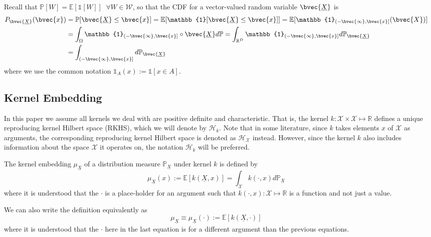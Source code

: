 \documentclass[twoside]{article} \usepackage{aistats2017}
\newcommand{\rv}[1]{\underline{#1}}
\newcommand{\extra}[1]{{\color{ForestGreen} #1}}
\begin{document}
		Recall that $\mathbb{P}[W] = \mathbb{E}[\mathbb{1}[W]] \;\; \forall W \in \mathcal{W}$, so that the CDF for a vector-valued random variable $\bvec{\rv{X}}$ is
		\begin{equation}
			\begin{aligned}
				P_{\bvec{\rv{X}}}(\bvec{x}) &= \mathbb{P}[\bvec{\rv{X}} \leq \bvec{x}] = \mathbb{E}[\mathbb{1}[\bvec{\rv{X}} \leq \bvec{x}]] = \mathbb{E}[\mathbb{1}_{(-\bvec{\infty}, \bvec{x}]}(\bvec{X})] \\
				&= \int_{\Omega} \mathbb{1}_{(-\bvec{\infty}, \bvec{x}]} \circ \bvec{\rv{X}} d \mathbb{P} = \int_{\mathbb{R}^{D}} \mathbb{1}_{(-\bvec{\infty}, \bvec{x}]} d \mathbb{P}_{\bvec{\rv{X}}} \\
				&= \int_{(-\bvec{\infty}, \bvec{x}]} d \mathbb{P}_{\bvec{\rv{X}}}
			\end{aligned}
		\label{eq:cdf_integral}
		\end{equation}
		where we use the common notation $\mathbb{1}_{A}(x) := \mathbb{1}[x \in A]$.
		
	\subsection{Kernel Embedding}
	
		In this paper we assume all kernels we deal with are positive definite and characteristic. That is, the kernel $k : \mathcal{X} \times \mathcal{X} \mapsto \mathbb{R}$ defines a unique reproducing kernel Hilbert space (RKHS), which we will denote by $\mathcal{H}_{k}$. \extra{Note that in some literature, since $k$ takes elements $x$ of $\mathcal{X}$ as arguments, the corresponding reproducing kernel Hilbert space is denoted as $\mathcal{H}_{\mathcal{X}}$ instead. However, since the kernel $k$ also includes information about the space $\mathcal{X}$ it operates on, the notation $\mathcal{H}_{k}$ will be preferred.}
		 
		The kernel embedding $\mu_{\rv{X}}$ of a distribution measure $\mathbb{P}_{\rv{X}}$ under kernel $k$ is defined by
		\begin{equation}
			\mu_{\rv{X}}(x) := \mathbb{E}[k(\rv{X}, x)] = \int_{\mathcal{X}} k(\cdot, x) d \mathbb{P}_{\rv{X}}
		\label{eq:basic_embedding}
		\end{equation}
		\extra{where it is understood that the $\cdot$ is a place-holder for an argument such that $k(\cdot, x) : \mathcal{X} \mapsto \mathbb{R}$ is a function and not just a value.}
		
		We can also write the definition equivalently as
		\begin{equation}
			\mu_{\rv{X}} \equiv \mu_{\rv{X}}(\cdot) := \mathbb{E}[k(\rv{X}, \cdot)]
		\label{eq:basic_embedding_alternative}
		\end{equation}
		\extra{where it is understood that the $\cdot$ here in the last equation is for a different argument than the previous equations.}
		 
\end{document}
